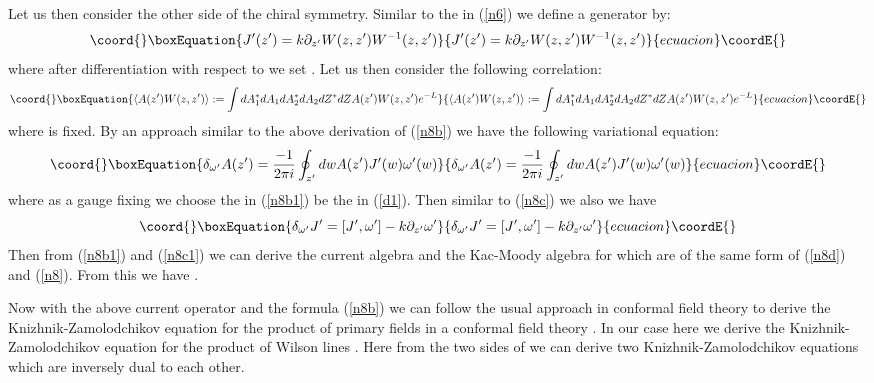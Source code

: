 \documentclass[a4paper,a4paper]{article}
\begin{document}
Let us then consider the other side of the chiral symmetry. 
Similar to the \coordHE{} in (\ref{n6}) we define a
generator \coordHE{} by:
\begin{equation}\coord{}\boxEquation{
J^{\prime}(z')= k\partial_{z'}W(z, z')W^{-1}(z, z')
\label{d1}
}{
J^{\prime}(z')= k\partial_{z'}W(z, z')W^{-1}(z, z')
}{ecuacion}\coordE{}\end{equation}
where after differentiation with respect to \coordHE{}
we set \coordHE{}. 
Let us then consider
 the following correlation:
\begin{equation}\coord{}\boxEquation{
\langle A(z')W(z,z') \rangle := 
\int dA_1^{*}dA_1dA_2^{*}dA_2dZ^{*}dZ
  A(z')W(z,z')e^{-L}
\label{n8aa}
}{
\langle A(z')W(z,z') \rangle := 
\int dA_1^{*}dA_1dA_2^{*}dA_2dZ^{*}dZ
  A(z')W(z,z')e^{-L}
}{ecuacion}\coordE{}\end{equation}
where \coordHE{} is fixed.
By an approach similar to the above derivation of (\ref{n8b})
we have the following  variational equation:
\begin{equation}\coord{}\boxEquation{
\delta_{\omega^{\prime}}A(z')
=\frac{-1}{2\pi i}\oint_{z^{\prime}} dwA(z')J^{\prime}(w)
\omega^{\prime}(w)
\label{n8b1}
}{
\delta_{\omega^{\prime}}A(z')
=\frac{-1}{2\pi i}\oint_{z^{\prime}} dwA(z')J^{\prime}(w)
\omega^{\prime}(w)
}{ecuacion}\coordE{}\end{equation}
where as a gauge fixing we choose the \coordHE{}
in (\ref{n8b1}) be the \coordHE{} in (\ref{d1}).
Then similar to (\ref{n8c}) we also we have
\begin{equation}\coord{}\boxEquation{
\delta_{\omega^{\prime}}J^{\prime}= 
\lbrack  J^{\prime}, \omega^{\prime}\rbrack -k\partial_{z'} \omega^{\prime}
\label{n8c1}
}{
\delta_{\omega^{\prime}}J^{\prime}= 
\lbrack  J^{\prime}, \omega^{\prime}\rbrack -k\partial_{z'} \omega^{\prime}
}{ecuacion}\coordE{}\end{equation}
Then from (\ref{n8b1}) and (\ref{n8c1}) we can derive the current
algebra and the Kac-Moody algebra for \coordHE{} which are of the
same form of (\ref{n8d}) and (\ref{n8}).
From this we  have \coordHE{}.

Now with the above current operator \coordHE{} and the formula (\ref{n8b}) we can follow the usual approach
in conformal field theory to derive the
Knizhnik-Zamolodchikov equation for the product of 
primary fields in a conformal field theory \cite{Fra}\cite{Fuc}\cite{Ng}.
In our case here we  derive the 
Knizhnik-Zamolodchikov equation for the product of
\coordHE{} Wilson lines
\coordHE{}.
Here from the two sides of 
\coordHE{}  we can derive two Knizhnik-Zamolodchikov equations which are inversely dual to each other. 
\end{document}
